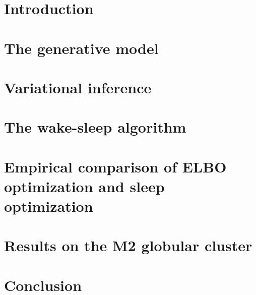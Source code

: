 \documentclass[12pt]{article}
\begin{document}
\vfill
\newpage


\section{Introduction}
\label{sec:intro}


\section{The generative model}
\label{sec:gen_model}


\section{Variational inference}
\label{sec:var_inference}


\section{The wake-sleep algorithm}
\label{sec:wake_sleep}


% 

\section{Empirical comparison of ELBO optimization and sleep optimization}


\section{Results on the M2 globular cluster}


\section{Conclusion}
\label{sec:discussion}



% 



\appendix

\renewcommand\thefigure{A.\arabic{figure}}
\renewcommand\thetable{A.\arabic{table}}
\setcounter{figure}{0}    
\setcounter{table}{0}    
\end{document}

